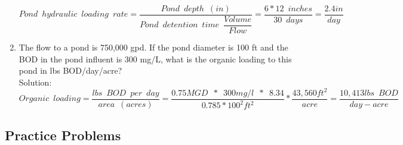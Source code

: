 \documentclass{article}
\begin{document}
\begin{enumerate}
$Pond \enspace hydraulic \enspace loading \enspace rate=\dfrac{Pond \enspace depth \enspace (in)}{Pond \enspace detention  \enspace time \enspace \dfrac{Volume}{Flow}}=\dfrac{6*12 \enspace inches}{30 \enspace days}=\boxed{\dfrac{2.4in}{day}}$\\
\vspace{0.5cm}

\item The flow to a pond is 750,000 gpd. If the pond diameter is 100 ft and the BOD in the pond influent is 300 mg/L, what is the organic loading to this pond in lbs BOD/day/acre?
\\
Solution:\\
$Organic \enspace loading=\dfrac{lbs \enspace BOD \enspace per \enspace day}{area \enspace (acres)}=\dfrac{0.75MGD \enspace * \enspace 300mg/l \enspace * \enspace 8.34}{0.785*100^2ft^2}*\dfrac{43,560ft^2}{acre}=\boxed{\dfrac{10,413lbs \enspace BOD}{day-acre}}$
\end{enumerate}

\subsection{Practice Problems} 
\end{document}
